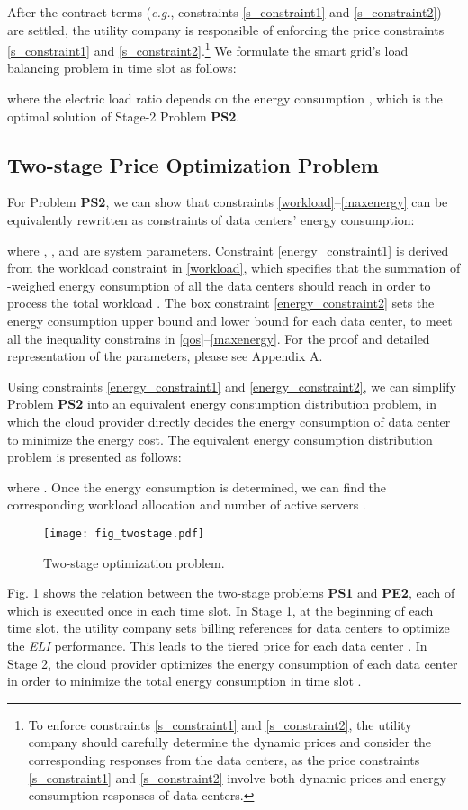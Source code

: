 \documentclass[journal]{IEEEtran}
\begin{document}
	After the contract terms (\emph{e.g.}, constraints \eqref{s_constraint1} and \eqref{s_constraint2}) are settled, the utility company is responsible of enforcing the price constraints \eqref{s_constraint1} and \eqref{s_constraint2}.\footnote{To enforce constraints \eqref{s_constraint1} and \eqref{s_constraint2}, the utility company should carefully determine the dynamic prices and consider the corresponding responses from the data centers, as the price constraints \eqref{s_constraint1} and \eqref{s_constraint2} involve both dynamic prices and energy consumption responses of data centers.} We formulate the smart grid's load balancing problem in time slot  as follows:
	
	
	where the electric load ratio  depends on the energy consumption , which is the optimal solution of Stage-2 Problem \textbf{PS2}.
	
	\subsection{Two-stage Price Optimization Problem}
	For Problem \textbf{PS2}, we can show that constraints \eqref{workload}--\eqref{maxenergy} can be equivalently rewritten as constraints of data centers' energy consumption:
	
	where , ,  and  are system parameters. Constraint \eqref{energy_constraint1} is derived from the workload constraint in \eqref{workload}, which specifies that the summation of -weighed energy consumption of all the data centers should reach  in order to process the total workload . The box constraint \eqref{energy_constraint2} sets the energy consumption upper bound  and lower bound  for each data center, to meet all the inequality constrains in \eqref{qos}--\eqref{maxenergy}. For the proof and detailed representation of the parameters, please see Appendix A.
	
	Using constraints \eqref{energy_constraint1} and \eqref{energy_constraint2}, we can simplify Problem \textbf{PS2} into an equivalent energy consumption distribution problem, in which the cloud provider directly decides the energy consumption of data center  to minimize the energy cost. The equivalent energy consumption distribution problem is presented as follows:
    
	
	where . Once the energy consumption  is determined, we can find the corresponding workload allocation  and number of active servers .
		
	\begin{figure}[t]
		\centering
		\texttt{[image: fig\_twostage.pdf]}
		\caption{\label{fig_twostage}Two-stage optimization problem.}
\end{figure}	
	Fig. \ref{fig_twostage} shows the relation between the two-stage problems \textbf{PS1} and \textbf{PE2}, each of which is executed once in each time slot. In Stage 1, at the beginning of each time slot, the utility company sets billing references for data centers to optimize the \emph{ELI} performance. This leads to the tiered price  for each data center . In Stage 2, the cloud provider optimizes the energy consumption  of each data center in order to minimize the total energy consumption  in time slot .
		
\end{document}

